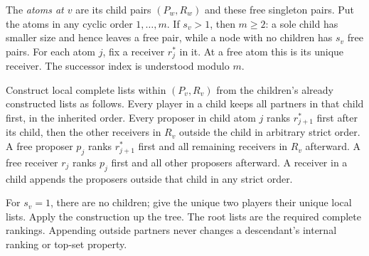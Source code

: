 \documentclass[11pt]{article}
\theoremstyle{definition}
\begin{document}
The \emph{atoms at $v$} are its child pairs $(P_w,R_w)$ and these free
singleton pairs. Put the atoms in any cyclic order $1,\ldots,m$. If
$s_v>1$, then $m\ge2$: a sole child has smaller size and hence leaves
a free pair, while a node with no children has $s_v$ free pairs. For
each atom $j$, fix a receiver $r_j^*$ in it. At a free atom this is its
unique receiver. The successor index is understood modulo $m$.

Construct local complete lists within $(P_v,R_v)$ from the children's
already constructed lists as follows. Every player in a child keeps
all partners in that child first, in the inherited order. Every
proposer in child atom $j$ ranks $r_{j+1}^*$ first after its child,
then the other receivers in $R_v$ outside the child in arbitrary
strict order. A free proposer $p_j$ ranks $r_{j+1}^*$ first and all
remaining receivers in $R_v$ afterward. A free receiver $r_j$ ranks
$p_j$ first and all other proposers afterward. A receiver in a child
appends the proposers outside that child in any strict order.

For $s_v=1$, there are no children; give the unique two players their
unique local lists. Apply the construction up the tree. The root
lists are the required complete rankings. Appending outside partners
never changes a descendant's internal ranking or top-set property.
\end{document}
